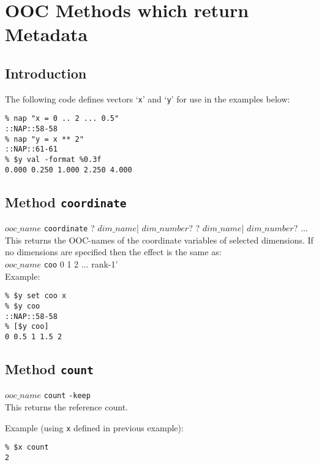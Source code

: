     \section{OOC Methods which return Metadata}

  \subsection{
    \label{intro}Introduction
  }
The following code defines vectors `\texttt{x}' and `\texttt{y}' for use in the examples below:
  \begin{verbatim}
% nap "x = 0 .. 2 ... 0.5"
::NAP::58-58
% nap "y = x ** 2"
::NAP::61-61
% $y val -format %0.3f
0.000 0.250 1.000 2.250 4.000
\end{verbatim}

  \subsection{
    \label{coordinate}Method \texttt{coordinate}
  }

  $ooc\_name$ 
  \texttt{coordinate} ?
  $dim\_name$|
  $dim\_number$? ?
  $dim\_name$|
  $dim\_number$? $\ldots$
  \\
  

This returns the OOC-names of the coordinate variables of selected
  dimensions. If no dimensions are specified then the effect is the
  same as:
  \\
  $ooc\_name$ 
  \texttt{coo} 0 1 2 $\ldots$ rank-1'
  \\
  

Example:
  \begin{verbatim}
% $y set coo x
% $y coo
::NAP::58-58
% [$y coo]
0 0.5 1 1.5 2
\end{verbatim}

  \subsection{
    \label{count}Method \texttt{count}
  }

  


  $ooc\_name$ 
  \texttt{count} 
  \texttt{-keep}
  \\
  

This returns the reference count.
  

Example (using 
  \texttt{x} defined in previous example):
  \begin{verbatim}
% $x count
2
\end{verbatim}

